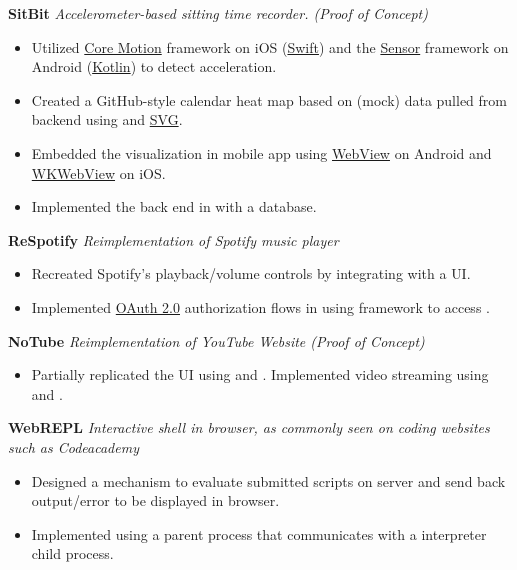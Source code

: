 \documentclass[11pt]{article}
\begin{document}
\textbf{SitBit} \enspace \textit{Accelerometer-based sitting time recorder. (Proof of Concept) } 
\begin{itemize}[leftmargin=15pt, noitemsep, topsep=0pt]
\item Utilized \underline{Core Motion} framework on iOS (\underline{Swift}) and the \underline{Sensor} framework on Android (\underline{Kotlin}) to detect acceleration.
\item Created a GitHub-style calendar heat map based on (mock) data pulled from backend using \underline{} and \underline{SVG}.
\item Embedded the visualization in mobile app using \underline{WebView} on Android and \underline{WKWebView} on iOS. 
\item Implemented the back end in \underline{} with a \underline{} database.
\end{itemize}
\vspace{0.5em}
%
\textbf{ReSpotify} \enspace \textit{Reimplementation of Spotify music player}
\begin{itemize}[leftmargin=15pt, noitemsep, topsep=0pt]
\item  Recreated Spotify's playback/volume controls by integrating \underline{} with a \underline{} UI.
\item Implemented \underline{OAuth 2.0} authorization flows in \underline{} using \underline{} framework to access \underline{}.
\end{itemize}
\vspace{0.5em}
%
\textbf{NoTube} \enspace \textit{Reimplementation of YouTube Website (Proof of Concept)}
\begin{itemize}[leftmargin=15pt, noitemsep, topsep=0pt]
\item Partially replicated the UI using \underline{} and \underline{}. Implemented video streaming using \underline{} and \underline{}.
\end{itemize}
\vspace{0.5em}
%
\textbf{WebREPL}  \enspace \textit{Interactive shell in browser, as commonly seen on coding websites such as Codeacademy}
\begin{itemize}[leftmargin=15pt, noitemsep, topsep=0pt]
\item Designed a mechanism to evaluate submitted scripts on server and send back output/error to be displayed in browser.
\item Implemented using a parent \underline{} process that communicates with a \underline{} interpreter child process.
\end{itemize}
\end{document}
